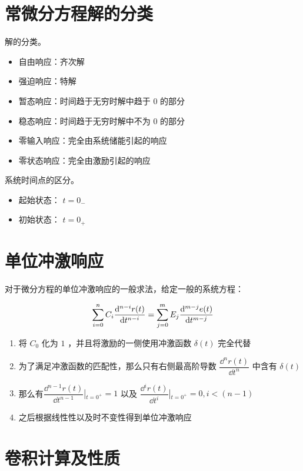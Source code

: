 \documentclass[cn,11pt,chinese,black,simple]{../elegantbook}
\begin{document}
\section{常微分方程解的分类}

解的分类。

\begin{itemize}
  \item 自由响应：齐次解
  \item 强迫响应：特解
  \item 暂态响应：时间趋于无穷时解中趋于 0 的部分
  \item 稳态响应：时间趋于无穷时解中不为 0 的部分
  \item 零输入响应：完全由系统储能引起的响应
  \item 零状态响应：完全由激励引起的响应
\end{itemize}



系统时间点的区分。

\begin{itemize}
  \item 起始状态： \(t = 0_-\)
  \item 初始状态： \(t = 0_+\)
\end{itemize}

\section{单位冲激响应}

对于微分方程的单位冲激响应的一般求法，给定一般的系统方程：

\[
\displaystyle\sum_{i=0}^{n} C_i \dfrac{\mathrm{d}^{n-i} r(t)}{\mathrm{d}t^{n-i}} = \displaystyle\sum_{j=0}^{m} E_j \dfrac{\mathrm{d}^{m-j} e(t)}{\mathrm{d}t^{m-j}} 
\]

\begin{enumerate}
  \item 将 \(C_0\) 化为 \(1\) ，并且将激励的一侧使用冲激函数 \(\delta(t)\) 完全代替
  \item 为了满足冲激函数的匹配性，那么只有右侧最高阶导数 \(\dfrac{\dd{^n r(t)}}{\dd{t^n}}\) 中含有 \(\delta(t)\)
  \item 那么有\(\dfrac{\dd{^{n-1} r(t)}}{\dd{t^{n-1}}}\left|_{t=0^+}\right. = 1\) 以及 \(\dfrac{\dd{^{i} r(t)}}{\dd{t^{i}}}\left|_{t=0^+}\right. = 0, i < (n-1)\)
  \item 之后根据线性性以及时不变性得到单位冲激响应
\end{enumerate}

\section{卷积计算及性质}
\end{document}
